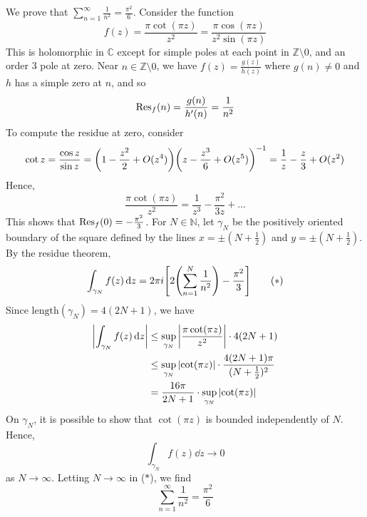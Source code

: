 \begin{example}
	We prove that \( \sum_{n=1}^\infty \frac{1}{n^2} = \frac{\pi^2}{6} \).
	Consider the function
	\[
		f(z) = \frac{\pi \cot(\pi z)}{z^2} = \frac{\pi \cos(\pi z)}{z^2 \sin(\pi z)}
	\]
	This is holomorphic in \( \mathbb C \) except for simple poles at each point in \( \mathbb Z \setminus \qty{0} \), and an order 3 pole at zero.
	Near \( n \in \mathbb Z \setminus \qty{0} \), we have \( f(z) = \frac{g(z)}{h(z)} \) where \( g(n) \neq 0 \) and \( h \) has a simple zero at \( n \), and so
	\[
		\Res_f(n) = \frac{g(n)}{h'(n)} = \frac{1}{n^2}
	\]
	To compute the residue at zero, consider
	\[
		\cot z = \frac{\cos z}{\sin z} = \qty(1 - \frac{z^2}{2} + O(z^4)) \qty(z - \frac{z^3}{6} + O(z^5))^{-1} = \frac{1}{z} - \frac{z}{3} + O(z^2)
	\]
	Hence,
	\[
		\frac{\pi \cot(\pi z)}{z^2} = \frac{1}{z^3} - \frac{\pi^2}{3z} + \dots
	\]
	This shows that \( \Res_f(0) = -\frac{\pi^2}{3} \).
	For \( N \in \mathbb N \), let \( \gamma_N \) be the positively oriented boundary of the square defined by the lines \( x = \pm (N + \frac{1}{2}) \) and \( y = \pm (N + \frac{1}{2}) \).
	By the residue theorem,
	\begin{equation}
		\int_{\gamma_N} f(z) \dd{z} = 2\pi i \qty[2\qty(\sum_{n=1}^N \frac{1}{n^2}) - \frac{\pi^2}{3}] \tag{\(\ast\)}
	\end{equation}
	Since \( \mathrm{length}(\gamma_N) = 4(2N + 1) \), we have
	\begin{align*}
		\abs{\int_{\gamma_N} f(z) \dd{z}} & \leq \sup_{\gamma_N} \abs{\frac{\pi \cot(\pi z)}{z^2}} \cdot 4(2N + 1)              \\
		                                  & \leq \sup_{\gamma_N} \abs{\cot(\pi z)} \cdot \frac{4(2N + 1)\pi}{(N+\frac{1}{2})^2} \\
		                                  & = \frac{16 \pi}{2N+1} \cdot \sup_{\gamma_N} \abs{\cot(\pi z)}
	\end{align*}
	On \( \gamma_N \), it is possible to show that \( \cot(\pi z) \) is bounded independently of \( N \).
	Hence,
	\[
		\int_{\gamma_N} f(z) \dd{z} \to 0
	\]
	as \( N \to \infty \).
	Letting \( N \to \infty \) in (\(\ast\)), we find
	\[
		\sum_{n=1}^\infty \frac{1}{n^2} = \frac{\pi^2}{6}
	\]
\end{example}
